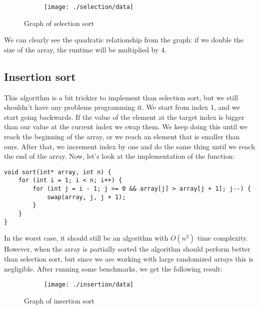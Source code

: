 \documentclass[a4paper,11pt]{article}
\begin{document}
    \begin{figure}[h]
        \centering
        \begin{subfigure}[b]{.5\textwidth}
            \centering
            \texttt{[image: ./selection/data]} %
        \end{subfigure}
        \caption{Graph of selection sort}
        \label{fig:graph_1}
    \end{figure}

    We can clearly see the quadratic relationship from the graph: if we double the size of the array, the runtime will be multiplied by 4.

    \subsection*{Insertion sort}

    This algorithm is a bit trickier to implement than selection sort, but we still shouldn't have any problems programming it.
    We start from index 1, and we start going backwards.
    If the value of the element at the target index is bigger than our value at the current index we swap them.
    We keep doing this until we reach the beginning of the array, or we reach an element that is smaller than ours.
    After that, we increment index by one and do the same thing until we reach the end of the array.
    Now, let's look at the implementation of the function:

    \begin{verbatim}
void sort(int* array, int n) {
    for (int i = 1; i < n; i++) {
        for (int j = i - 1; j >= 0 && array[j] > array[j + 1]; j--) {
            swap(array, j, j + 1);
        }
    }
}
    \end{verbatim}
    In the worst case, it should still be an algorithm with $O(n^2)$ time complexity.
    However, when the array is partially sorted the algorithm should perform better than selection sort, but since we are working with large randomized arrays this is negligible.
    After running some benchmarks, we get the following result:

    \begin{figure}[h]
        \centering
        \begin{subfigure}[b]{.5\textwidth}
            \centering
            \texttt{[image: ./insertion/data]} %
        \end{subfigure}
        \caption{Graph of insertion sort}
        \label{fig:graph_2}
    \end{figure}
\end{document}

